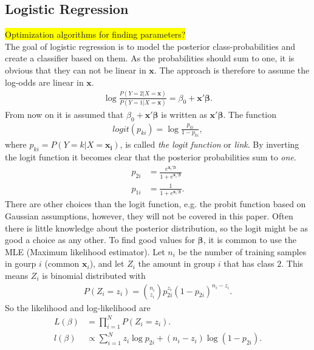 \subsection{Logistic Regression}
\label{sub:Logistic Regression}
\colorbox{yellow}{Optimization algorithms for finding parameters?}\\
The goal of logistic regression is to model the posterior class-probabilities and create a classifier based on them. As the probabilities should sum to one, it is obvious that they can not be linear in $\mathbf{x}$. The approach is therefore to assume the log-odds are linear in $\mathbf{x}$. 
\begin{align}
  \label{eq:logclass} 
   \log \frac{P(Y=2|X=\mathbf{x})}{P(Y=1|X=\mathbf{x})} = \beta_0 + \mathbf{x}'\bm \beta.
\end{align}
From now on it is assumed that $\beta_0 + \mathbf{x}' \bm \beta$ is written as $\mathbf{x}' \bm \beta$.
The function
\begin{align}
  logit(p_{ki}) = \log  \frac{p_{ki}}{1-p_{ki}},
\end{align}
where $p_{ki} = P(Y=k|X=\mathbf{x_i})$, is called \textit{the logit function} or \textit{link}. By inverting the logit function it becomes clear that the posterior probabilities sum to \textit{one}.
\begin{align}
  p_{2i} &=  \frac{e^{\mathbf{x}_i'\bm \beta}}{1 + e^{\mathbf{x}_i'\bm \beta}} \\
  p_{1i} &=  \frac{1}{1 + e^{\mathbf{x}_i'\bm \beta}}.
\end{align}
There are other choices than the logit function, e.g. the probit function based on Gaussian assumptions, however, they will not be covered in this paper. 
Often there is little knowledge about the posterior distribution, so the logit might be as good a choice as any other. 
To find good values for $\bm \beta$, it is common to use the MLE (Maximum likelihood estimator). Let $n_i$ be the number of training samples in gourp $i$ (common $\mathbf{x}_i$), and let $Z_i$ the amount in group $i$ that has class $2$. This means $Z_i$ is binomial distributed with
\begin{align}
  P(Z_i = z_i) = \binom{n_i}{z_i} p_{2i}^{z_i} (1-p_{2i})^{n_i - z_i}.
\end{align}
So the likelihood and log-likelihood are
\begin{align}
  L(\beta) &= \prod_{i = 1}^{N} P(Z_i = z_i). \\
  l(\beta) &\propto \sum^{N}_{i=1} z_i \log p_{2i} + (n_i - z_i) \log (1- p_{2i}).
\end{align}

